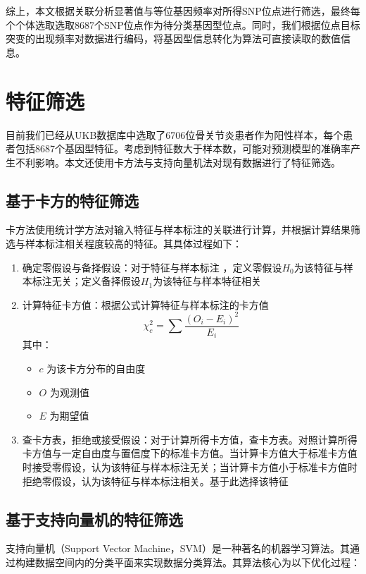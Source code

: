 综上，本文根据关联分析显著值与等位基因频率对所得SNP位点进行筛选，最终每个个体选取选取8687个SNP位点作为待分类基因型位点。同时，我们根据位点目标突变的出现频率对数据进行编码，将基因型信息转化为算法可直接读取的数值信息。

\section{特征筛选}
目前我们已经从UKB数据库中选取了6706位骨关节炎患者作为阳性样本，每个患者包括8687个基因型特征。考虑到特征数大于样本数，可能对预测模型的准确率产生不利影响。\cite{janes_optimal_2005}本文还使用卡方法与支持向量机法对现有数据进行了特征筛选。
\subsection{基于卡方的特征筛选}

卡方法使用统计学方法对输入特征与样本标注的关联进行计算，并根据计算结果筛选与样本标注相关程度较高的特征。其具体过程如下：

\begin{enumerate}
\item
  确定零假设与备择假设：对于特征与样本标注
  ，定义零假设$H_0$为该特征与样本标注无关；定义备择假设$H_1$为该特征与样本特征相关
\item
  计算特征卡方值：根据公式计算特征与样本标注的卡方值
    \begin{equation}
        \chi_c^2=\sum \frac{(O_{i}-E_i)^2}{E_i}
    \end{equation}
  其中：

  \begin{itemize}
  \item
    \(c\) 为该卡方分布的自由度
  \item
    \(O\) 为观测值
  \item
    \(E\) 为期望值
  \end{itemize}
\item
  查卡方表，拒绝或接受假设：对于计算所得卡方值，查卡方表。对照计算所得卡方值与一定自由度与置信度下的标准卡方值。当计算卡方值大于标准卡方值时接受零假设，认为该特征与样本标注无关；当计算卡方值小于标准卡方值时拒绝零假设，认为该特征与样本标注相关。基于此选择该特征
\end{enumerate}
\subsection{ 基于支持向量机的特征筛选}

支持向量机（Support Vector Machine，SVM）是一种著名的机器学习算法。其通过构建数据空间内的分类平面来实现数据分类算法。其算法核心为以下优化过程：

